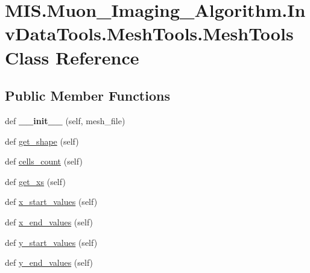 \hypertarget{classMIS_1_1Muon__Imaging__Algorithm_1_1InvDataTools_1_1MeshTools_1_1MeshTools}{}\section{M\+I\+S.\+Muon\+\_\+\+Imaging\+\_\+\+Algorithm.\+Inv\+Data\+Tools.\+Mesh\+Tools.\+Mesh\+Tools Class Reference}
\label{classMIS_1_1Muon__Imaging__Algorithm_1_1InvDataTools_1_1MeshTools_1_1MeshTools}
\subsection*{Public Member Functions}
\begin{DoxyCompactItemize}
\item 
\mbox{\label{classMIS_1_1Muon__Imaging__Algorithm_1_1InvDataTools_1_1MeshTools_1_1MeshTools_a8766a59ac177988045b409e1aac9f2bf}} 
def {\bfseries \+\_\+\+\_\+init\+\_\+\+\_\+} (self, mesh\+\_\+file)
\item 
def \hyperlink{classMIS_1_1Muon__Imaging__Algorithm_1_1InvDataTools_1_1MeshTools_1_1MeshTools_a7f5fb36076ae03ef7c6588d291dc3ccb}{get\+\_\+shape} (self)
\item 
def \hyperlink{classMIS_1_1Muon__Imaging__Algorithm_1_1InvDataTools_1_1MeshTools_1_1MeshTools_a7d823017f491643fef80f7e55636999e}{cells\+\_\+count} (self)
\item 
def \hyperlink{classMIS_1_1Muon__Imaging__Algorithm_1_1InvDataTools_1_1MeshTools_1_1MeshTools_a12d6a2d78718504fa3d019e83c12a449}{get\+\_\+xs} (self)
\item 
def \hyperlink{classMIS_1_1Muon__Imaging__Algorithm_1_1InvDataTools_1_1MeshTools_1_1MeshTools_a8de52876023b98d5d8cc21d356fa2122}{x\+\_\+start\+\_\+values} (self)
\item 
def \hyperlink{classMIS_1_1Muon__Imaging__Algorithm_1_1InvDataTools_1_1MeshTools_1_1MeshTools_a491635663c12312afc9f3b22f58323d5}{x\+\_\+end\+\_\+values} (self)
\item 
def \hyperlink{classMIS_1_1Muon__Imaging__Algorithm_1_1InvDataTools_1_1MeshTools_1_1MeshTools_ae44cd6a9b4801653fd33d35d1ad89a20}{y\+\_\+start\+\_\+values} (self)
\item 
def \hyperlink{classMIS_1_1Muon__Imaging__Algorithm_1_1InvDataTools_1_1MeshTools_1_1MeshTools_a1be359f4ae4ee6460a79d6fea5a87a43}{y\+\_\+end\+\_\+values} (self)

\end{DoxyCompactItemize}
